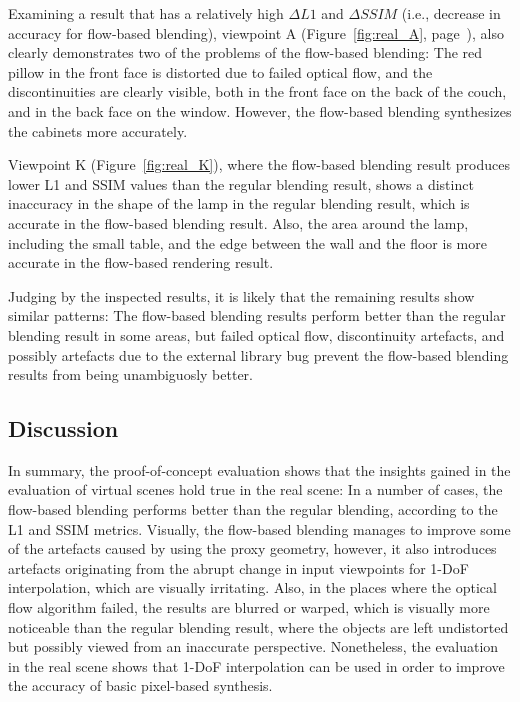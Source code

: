 Examining a result that has a relatively high $\Delta L1$ and $\Delta SSIM$ (i.e., decrease in accuracy for flow-based blending), viewpoint A (Figure~\ref{fig:real_A}, page~\pageref{fig:real_A}), also clearly demonstrates two of the problems of the flow-based blending: The red pillow in the front face is distorted due to failed optical flow, and the discontinuities are clearly visible, both in the front face on the back of the couch, and in the back face on the window. However, the flow-based blending synthesizes the cabinets more accurately.

Viewpoint K (Figure~\ref{fig:real_K}), where the flow-based blending result produces lower L1 and SSIM values than the regular blending result, shows a distinct inaccuracy in the shape of the lamp in the regular blending result, which is accurate in the flow-based blending result. Also, the area around the lamp, including the small table, and the edge between the wall and the floor is more accurate in the flow-based rendering result.

Judging by the inspected results, it is likely that the remaining results show similar patterns: The flow-based blending results perform better than the regular blending result in some areas, but failed optical flow, discontinuity artefacts, and possibly artefacts due to the external library bug prevent the flow-based blending results from being unambiguosly better.

\subsection{Discussion}
In summary, the proof-of-concept evaluation shows that the insights gained in the evaluation of virtual scenes hold true in the real scene: 
In a number of cases, the flow-based blending performs better than the regular blending, according to the L1 and SSIM metrics.
Visually, the flow-based blending manages to improve some of the artefacts caused by using the proxy geometry, however, it also introduces artefacts originating from the abrupt change in input viewpoints for 1-DoF interpolation, which are visually irritating.
Also, in the places where the optical flow algorithm failed, the results are blurred or warped, which is visually more noticeable than the regular blending result, where the objects are left undistorted but possibly viewed from an inaccurate perspective.
Nonetheless, the evaluation in the real scene shows that 1-DoF interpolation can be used in order to improve the accuracy of basic pixel-based synthesis.


